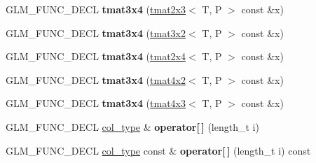 \begin{DoxyCompactItemize}
\item 
G\+L\+M\+\_\+\+F\+U\+N\+C\+\_\+\+D\+E\+CL {\bfseries tmat3x4} (\hyperlink{structglm_1_1detail_1_1tmat2x3}{tmat2x3}$<$ T, P $>$ const \&x)\hypertarget{structglm_1_1detail_1_1tmat3x4_a7e69575011350af7e2bed0308f50f0db}{}\label{structglm_1_1detail_1_1tmat3x4_a7e69575011350af7e2bed0308f50f0db}

\item 
G\+L\+M\+\_\+\+F\+U\+N\+C\+\_\+\+D\+E\+CL {\bfseries tmat3x4} (\hyperlink{structglm_1_1detail_1_1tmat3x2}{tmat3x2}$<$ T, P $>$ const \&x)\hypertarget{structglm_1_1detail_1_1tmat3x4_ab32c639d1270be7cd3b0d6560d6180f2}{}\label{structglm_1_1detail_1_1tmat3x4_ab32c639d1270be7cd3b0d6560d6180f2}

\item 
G\+L\+M\+\_\+\+F\+U\+N\+C\+\_\+\+D\+E\+CL {\bfseries tmat3x4} (\hyperlink{structglm_1_1detail_1_1tmat2x4}{tmat2x4}$<$ T, P $>$ const \&x)\hypertarget{structglm_1_1detail_1_1tmat3x4_a80b305218294c0d85db5a2fe73712a66}{}\label{structglm_1_1detail_1_1tmat3x4_a80b305218294c0d85db5a2fe73712a66}

\item 
G\+L\+M\+\_\+\+F\+U\+N\+C\+\_\+\+D\+E\+CL {\bfseries tmat3x4} (\hyperlink{structglm_1_1detail_1_1tmat4x2}{tmat4x2}$<$ T, P $>$ const \&x)\hypertarget{structglm_1_1detail_1_1tmat3x4_aa3747818fd18f9998c5fc79ce434c236}{}\label{structglm_1_1detail_1_1tmat3x4_aa3747818fd18f9998c5fc79ce434c236}

\item 
G\+L\+M\+\_\+\+F\+U\+N\+C\+\_\+\+D\+E\+CL {\bfseries tmat3x4} (\hyperlink{structglm_1_1detail_1_1tmat4x3}{tmat4x3}$<$ T, P $>$ const \&x)\hypertarget{structglm_1_1detail_1_1tmat3x4_abde714d32a6d0da024687e6026f47e55}{}\label{structglm_1_1detail_1_1tmat3x4_abde714d32a6d0da024687e6026f47e55}

\item 
G\+L\+M\+\_\+\+F\+U\+N\+C\+\_\+\+D\+E\+CL \hyperlink{structglm_1_1detail_1_1tvec4}{col\+\_\+type} \& {\bfseries operator\mbox{[}$\,$\mbox{]}} (length\+\_\+t i)\hypertarget{structglm_1_1detail_1_1tmat3x4_a787deb7b8f8d3d0f2e1e5df0c6f47bc7}{}\label{structglm_1_1detail_1_1tmat3x4_a787deb7b8f8d3d0f2e1e5df0c6f47bc7}

\item 
G\+L\+M\+\_\+\+F\+U\+N\+C\+\_\+\+D\+E\+CL \hyperlink{structglm_1_1detail_1_1tvec4}{col\+\_\+type} const \& {\bfseries operator\mbox{[}$\,$\mbox{]}} (length\+\_\+t i) const \hypertarget{structglm_1_1detail_1_1tmat3x4_a529efc696d18ecbffe57c3726e453cad}{}\label{structglm_1_1detail_1_1tmat3x4_a529efc696d18ecbffe57c3726e453cad}


\end{DoxyCompactItemize}
